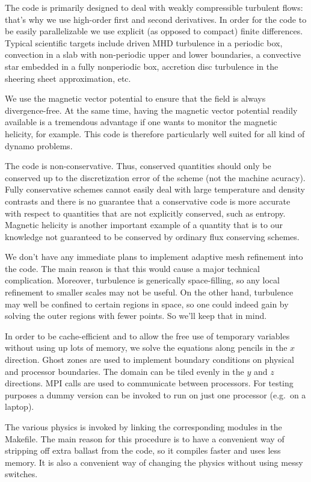 \documentclass[12pt,twoside,notitlepage,a4paper]{article}
\begin{document}
The code is primarily designed to deal with weakly compressible turbulent
flows: that's why we use high-order first and second derivatives.
In order for the code to be easily parallelizable we use explicit
(as opposed to compact) finite differences.
Typical scientific targets include driven MHD turbulence in a periodic box,
convection in a slab with non-periodic upper and lower boundaries,
a convective star embedded in a fully nonperiodic box, accretion disc turbulence in
the sheering sheet approximation, etc.

We use the magnetic vector potential to ensure that the field
is always divergence-free. At the same time, having the magnetic
vector potential readily available is a tremendous advantage if
one wants to monitor the magnetic helicity, for example.
This code is therefore particularly well suited for all kind of
dynamo problems.

The code is non-conservative. Thus, conserved quantities should only be
conserved up to the discretization error of the scheme (not the machine acuracy). Fully conservative
schemes cannot easily deal with large temperature and density contrasts
and there is no guarantee that a conservative code is more accurate with
respect to quantities that are not explicitly conserved, such as entropy.
Magnetic helicity is another important example of a quantity that is to
our knowledge not guaranteed to be conserved by ordinary flux conserving
schemes.

We don't have any immediate plans to implement adaptive mesh refinement
into the code. The main reason is that this would cause a major technical
complication. Moreover, turbulence is generically space-filling, so any
local refinement to smaller scales may not be useful. On the other hand,
turbulence may well be confined to certain regions in space, so one
could indeed gain by solving the outer regions with fewer points.
So we'll keep that in mind.

In order to be cache-efficient and to allow the free use of temporary
variables without using up lots of memory, we solve the equations along
pencils in the $x$ direction. Ghost zones are used to implement boundary
conditions on physical and processor boundaries. The domain can be tiled
evenly in the $y$ and $z$ directions. MPI calls are used to communicate
between processors. For testing purposes a dummy version can be invoked
to run on just one processor (e.g.\ on a laptop).

The various physics is invoked by linking the corresponding modules in the
Makefile. The main reason for this procedure is to have a convenient way
of stripping off extra ballast from the code, so it compiles faster and
uses less memory. It is also a convenient way of changing the physics
without using messy switches.
\end{document}
